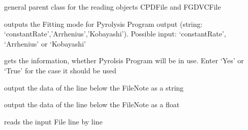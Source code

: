 \documentclass[letterpaper,10pt,english]{sphinxmanual}
\begin{document}
\begin{fulllineitems}
\label{InputOutputClasses:InformationFiles.ReadFile}
general parent class for the reading objects CPDFile and FGDVCFile

\begin{fulllineitems}
\label{InputOutputClasses:InformationFiles.ReadFile.Fitting}
outputs the Fitting mode for Pyrolysis Program output (string: `constantRate','Arrhenius','Kobayashi'). Possible input: `constantRate', `Arrhenius' or `Kobayashi'

\end{fulllineitems}


\begin{fulllineitems}
\label{InputOutputClasses:InformationFiles.ReadFile.UsePyrolProgr}
gets the information, whether Pyrolsis Program will be in use. Enter `Yes' or `True' for the case it should be used

\end{fulllineitems}


\begin{fulllineitems}
\label{InputOutputClasses:InformationFiles.ReadFile.getText}
output the data of the line below the FileNote as a string

\end{fulllineitems}


\begin{fulllineitems}
\label{InputOutputClasses:InformationFiles.ReadFile.getValue}
output the data of the line below the FileNote as a float

\end{fulllineitems}


\begin{fulllineitems}
\label{InputOutputClasses:InformationFiles.ReadFile.readLines}
reads the input File line by line

\end{fulllineitems}


\end{fulllineitems}
\end{document}
